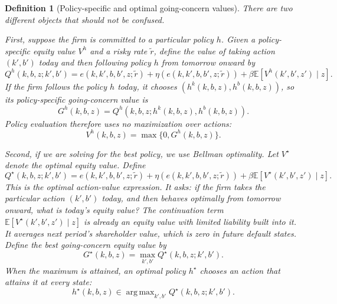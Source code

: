 \documentclass[11pt]{article}
\newtheorem{definition}{Definition}
\newcommand{\E}{\mathbb{E}}
\newcommand{\1}{\mathbf{1}}
\DeclareMathOperator*{\argmax}{arg\,max}
\begin{document}
\begin{definition}[Policy-specific and optimal going-concern values]
\label{def:going-concern-value}
There are two different objects that should not be confused.

First, suppose the firm is committed to a particular policy \(h\). Given a
policy-specific equity value \(V^h\) and a risky rate \(\widetilde r\), define
the value of taking action \((k',b')\) today and then following policy \(h\) from
tomorrow onward by
\begin{equation}
  Q^h(k,b,z;k',b')
  =
  e(k,k',b,b',z;\widetilde r)
  +\eta(e(k,k',b,b',z;\widetilde r))
  +\beta \E[V^h(k',b',z')\mid z].
  \label{eq:policy-q-value}
\end{equation}
If the firm follows the policy \(h\) today, it chooses
\((h^k(k,b,z),h^b(k,b,z))\), so its policy-specific going-concern value is
\begin{equation}
  G^h(k,b,z)
  =
  Q^h(k,b,z;h^k(k,b,z),h^b(k,b,z)).
  \label{eq:policy-going-concern}
\end{equation}
Policy evaluation therefore uses no maximization over actions:
\begin{equation}
  V^h(k,b,z)=\max\{0,G^h(k,b,z)\}.
  \label{eq:policy-bellman}
\end{equation}

Second, if we are solving for the best policy, we use Bellman optimality. Let
\(V^\star\) denote the optimal equity value. Define
\begin{equation}
  Q^\star(k,b,z;k',b')
  =
  e(k,k',b,b',z;\widetilde r)
  +\eta(e(k,k',b,b',z;\widetilde r))
  +\beta \E[V^\star(k',b',z')\mid z].
  \label{eq:q-value}
\end{equation}
This is the optimal action-value expression. It asks: if the firm takes the
particular action \((k',b')\) today, and then behaves optimally from tomorrow
onward, what is today's equity value? The continuation term
\(\E[V^\star(k',b',z')\mid z]\) is already an equity value with limited
liability built into it. It averages next period's shareholder value, which is
zero in future default states. Define the best going-concern equity value by
\begin{equation}
  G^\star(k,b,z) = \max_{k',b'} Q^\star(k,b,z;k',b').
  \label{eq:best-going-concern}
\end{equation}
When the maximum is attained, an optimal policy \(h^\star\) chooses an
action that attains it at every state:
\[
  h^\star(k,b,z)
  \in
  \argmax_{k',b'} Q^\star(k,b,z;k',b').
\]
\end{definition}
\end{document}
